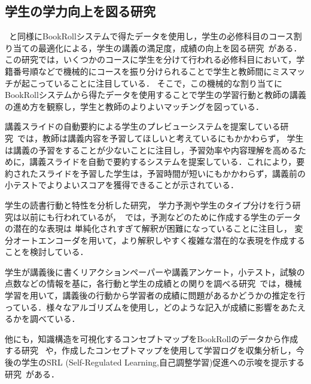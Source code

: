 \documentclass[a4paper,12pt]{ltjsreport}
\begin{document}
\subsection{学生の学力向上を図る研究}

~\cite{Predictionstudentperformance2022}と同様にBookRollシステムで得たデータを使用し，学生の必修科目のコース割り当ての最適化による，学生の講義の満足度，成績の向上を図る研究~\cite{Shimada2019OptimizingAO}がある．この研究では，いくつかのコースに学生を分けて行われる必修科目において，学籍番号順などで機械的にコースを振り分けられることで学生と教師間にミスマッチが起こっていることに注目している．
そこで，この機械的な割り当てにBookRollシステムから得たデータを使用することで学生の学習行動と教師の講義の進め方を観察し，学生と教師のよりよいマッチングを図っている．

講義スライドの自動要約による学生のプレビューシステムを提案している研究~\cite{AutomaticSummarization}では，教師は講義内容を予習してほしいと考えているにもかかわらず，
学生は講義の予習をすることが少ないことに注目し，予習効率や内容理解を高めるために，講義スライドを自動で要約するシステムを提案している．これにより，要約されたスライドを予習した学生は，予習時間が短いにもかかわらず，講義前の小テストでよりよいスコアを獲得できることが示されている．

学生の読書行動と特性を分析した研究，
学力予測や学生のタイプ分けを行う研究は以前にも行われているが，~\cite{Studentsreadingchara}では，予測などのために作成する学生のデータの潜在的な表現は
単純化されすぎて解釈が困難になっていることに注目し，
変分オートエンコーダを用いて，より解釈しやすく複雑な潜在的な表現を作成することを検討している．

学生が講義後に書くリアクションペーパーや講義アンケート，小テスト，試験の点数などの情報を基に，各行動と学生の成績との関りを調べる研究~\cite{machinelearningscorepre}では，機械学習を用いて，講義後の行動から学習者の成績に問題があるかどうかの推定を行っている．様々なアルゴリズムを使用し，どのような記入が成績に影響をあたえるかを調べている．

他にも，知識構造を可視化するコンセプトマップをBookRollのデータから作成する研究
~\cite{BRMAP2018}や，作成したコンセプトマップを使用して学習ログを収集分析し，今後の学生のSRL (Self-Regulated Learning,自己調整学習)促進への示唆を提示する研究~\cite{LearningAnalytics2021}がある．
\end{document}
